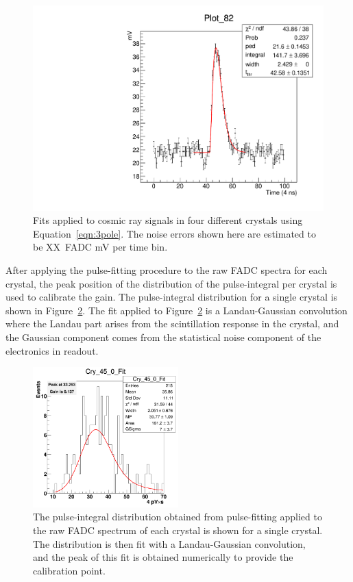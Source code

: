 \documentclass[twoside]{article}
\begin{document}
\begin{figure}[H]
\begin{minipage}{0.5\textwidth}
\end{minipage}\hfill\begin{minipage}{0.5\textwidth}
 \includegraphics[width=\textwidth]{pics/rawfit4.pdf}
 \end{minipage}
  \caption{Fits applied to cosmic ray signals in four different crystals using Equation~\eqref{eqn:3pole}. The noise errors shown here are estimated to be XX~FADC mV per time bin.}
  \label{fig:rawFits}
\end{figure}
After applying the pulse-fitting procedure to the raw FADC spectra for each crystal, the peak position of the distribution of the pulse-integral per crystal is used to calibrate the gain. The pulse-integral distribution for a single crystal is shown in Figure~\ref{pulseIntFit}. The fit applied to Figure~\ref{pulseIntFit} is a Landau-Gaussian convolution where the Landau part arises from the scintillation response in the crystal, and the Gaussian component comes from the statistical noise component of the electronics in readout. 
\begin{figure}[htb]
  \centering
      \includegraphics[width=0.5\textwidth]{pics/Cry_45_0_Fit.png}
  \caption{The pulse-integral distribution obtained from pulse-fitting applied to the raw FADC spectrum of each crystal is shown for a single crystal. The distribution is then fit with a Landau-Gaussian convolution, and the peak of this fit is obtained numerically to provide the calibration point.}
  \label{pulseIntFit}
\end{figure}	
\end{document}
